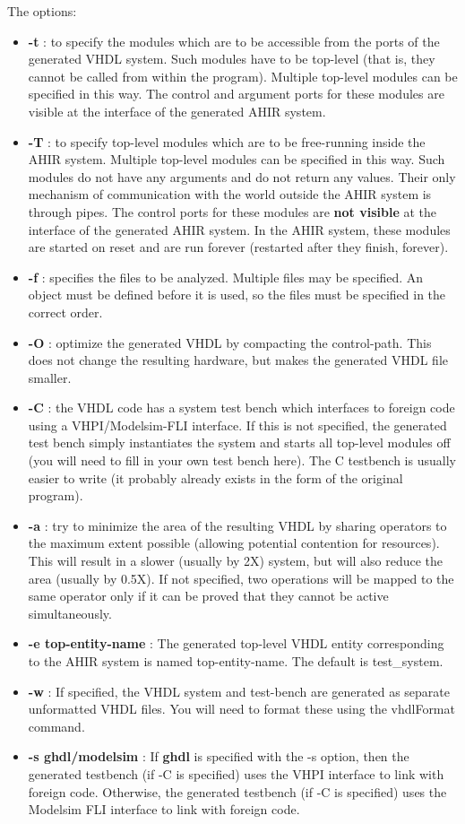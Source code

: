 The options:
\begin{itemize}
\item {\bf -t} : to specify the modules which are to be 
accessible from the ports of the generated VHDL system.
Such modules have to be top-level (that is, they cannot
be called from within the program).
Multiple top-level modules can be specified in this way.
The control and argument ports for these modules are
visible at the interface of the generated AHIR system.
\item {\bf -T} : to specify top-level modules which are to be 
free-running inside the AHIR system.
Multiple top-level modules can be specified in this way.
Such modules do not have any arguments and do not return
any values.  Their only mechanism of communication with
the world outside the AHIR system is through pipes.
The control ports for these modules are
{\bf not visible} at the interface of the generated AHIR system.
In the AHIR system, these modules are started on reset
and are run forever (restarted after they finish, forever).
\item {\bf -f} : specifies the \vC files to be analyzed. 
Multiple \vC files may be specified.  An object must be
defined before it is used, so the \vC files must be 
specified in the correct order.
\item {\bf -O} : optimize the generated VHDL by compacting
the control-path.  This does not change the resulting
hardware, but makes the generated VHDL file smaller.
\item {\bf -C} : the VHDL code has a system test bench which
interfaces to foreign code using a VHPI/Modelsim-FLI interface.
If this is not specified, the  generated test bench simply
instantiates the system and starts all top-level modules
off (you will need to fill in your own test bench here).
The C testbench is usually easier to write (it probably
already exists in the form of the original program).
\item {\bf -a} : try to minimize the area of the resulting
VHDL by sharing operators to the maximum extent possible
(allowing potential contention for resources).  This will
result in a slower (usually by 2X) system, but will
also reduce the area (usually by 0.5X).  If not specified,
two operations will be mapped to the same
operator  only if it can be proved that they cannot be active simultaneously.
\item {\bf -e top-entity-name} : The generated top-level VHDL entity
corresponding to the AHIR system is named top-entity-name.  The default
is test\_system.
\item {\bf -w} :  If specified, the VHDL system and test-bench are
generated as separate unformatted VHDL files.  You will need to
format these using the vhdlFormat command.
\item {\bf -s ghdl/modelsim} :  If {\bf ghdl} is specified
with the -s option, then the generated testbench (if -C is specified)
uses the VHPI interface to link with foreign code.  Otherwise,
the generated testbench (if -C is specified) uses the Modelsim FLI
interface to link with foreign code.
\end{itemize}


